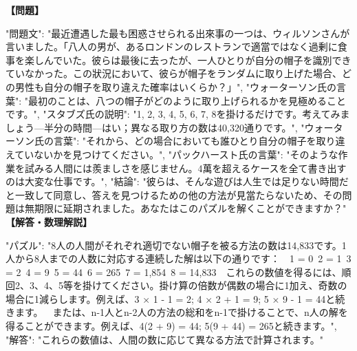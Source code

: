 \documentclass[10pt,a4paper,oneside,openany]{ltjsbook}
\begin{document}
\begin{tcolorbox}[colback=softblue,colframe=primaryblue,title=\textbf{第 267 問：THE WRONG HATS.},arc=2mm,boxrule=1pt,breakable]
\textbf{【問題】}\par\vspace{0.3em}
{
  "問題文": "最近遭遇した最も困惑させられる出來事の一つは、ウィルソンさんが言いました。「八人の男が、あるロンドンのレストランで適當ではなく過剰に食事を楽しんでいた。彼らは最後に去ったが、一人ひとりが自分の帽子を識別できていなかった。この狀況において、彼らが帽子をランダムに取り上げた場合、どの男性も自分の帽子を取り違えた確率はいくらか？」",
  "ウォーターソン氏の言葉": "最初のことは、八つの帽子がどのように取り上げられるかを見極めることです。",
  "スタブズ氏の説明": "1, 2, 3, 4, 5, 6, 7, 8を掛けるだけです。考えてみましょう—半分の時間—はい；異なる取り方の数は40,320通りです。",
  "ウォーターソン氏の言葉": "それから、どの場合においても誰ひとり自分の帽子を取り違えていないかを見つけてください。",
  "パックハースト氏の言葉": "そのような作業を試みる人間には羨ましさを感じません。4萬を超えるケースを全て書き出すのは大変な仕事です。",
  "結論": "彼らは、そんな遊びは人生では足りない時間だと一致して同意し、答えを見つけるための他の方法が見當たらないため、その問題は無期限に延期されました。あなたはこのパズルを解くことができますか？"
}
\tcblower
\textbf{【解答・数理解説】}\par\vspace{0.3em}
{
    "パズル": "8人の人間がそれぞれ適切でない帽子を被る方法の数は14,833です。1人から8人までの人数に対応する連続した解は以下の通りです：\
\
1 = 0\
2 = 1\
3 = 2\
4 = 9\
5 = 44\
6 = 265\
7 = 1,854\
8 = 14,833\
\
これらの数値を得るには、順回2、3、4、5等を掛けてください。掛け算の倍数が偶数の場合に1加え、奇数の場合に1減らします。例えば、3 × 1 - 1 = 2; 4 × 2 + 1 = 9; 5 × 9 - 1 = 44と続きます。\
\
または、n-1人とn-2人の方法の総和をn-1で掛けることで、n人の解を得ることができます。例えば、4(2 + 9) = 44; 5(9 + 44) = 265と続きます。",
    "解答": "これらの数値は、人間の数に応じて異なる方法で計算されます。"
}
\end{tcolorbox}
\end{document}
